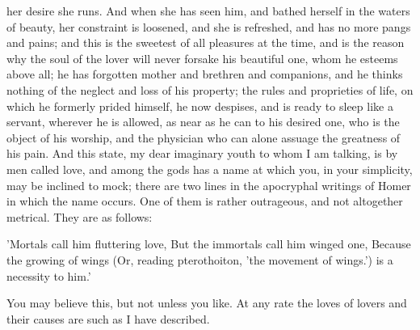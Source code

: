 \documentclass[11pt,letter]{article}
\begin{document}
her desire she runs. And when she has seen him, and bathed herself in the waters of beauty, her constraint is loosened, and she is refreshed, and has no more pangs and pains; and this is the sweetest of all pleasures at the time, and is the reason why the soul of the lover will never forsake his beautiful one, whom he esteems above all; he has forgotten mother and brethren and companions, and he thinks nothing of the neglect and loss of his property; the rules and proprieties of life, on which he formerly prided himself, he now despises, and is ready to sleep like a servant, wherever he is allowed, as near as he can to his desired one, who is the object of his worship, and the physician who can alone assuage the greatness of his pain. And this state, my dear imaginary youth to whom I am talking, is by men called love, and among the gods has a name at which you, in your simplicity, may be inclined to mock; there are two lines in the apocryphal writings of Homer in which the name occurs. One of them is rather outrageous, and not altogether metrical. They are as follows:

\par  'Mortals call him fluttering love, But the immortals call him winged one, Because the growing of wings (Or, reading pterothoiton, 'the movement of wings.') is a necessity to him.'

\par  You may believe this, but not unless you like. At any rate the loves of lovers and their causes are such as I have described.
\end{document}

